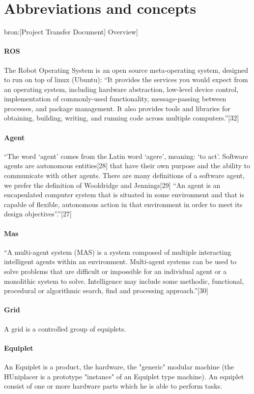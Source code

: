\documentclass[12pt,a4paper]{report}
\begin{document}
\chapter{Abbreviations and concepts}
bron:[Project Transfer Document] Overview]
\subsubsection{ROS}
The Robot Operating System is an open source meta-operating system, designed to run on top of linux (Ubuntu): “It provides the services you would expect from an operating system, including hardware abstraction, low-level device control, implementation of commonly-used functionality, message-passing between processes, and package management. It also provides tools and libraries for obtaining, building, writing, and running code across multiple computers.”[32]
\subsubsection{Agent}
“The word ‘agent’ comes from the Latin word ‘agere’, meaning: ‘to act’. Software agents are autonomous entities[28] that have their own purpose and the ability to communicate with other agents. There are many definitions of a software agent, we prefer the definition of Wooldridge and Jennings[29] “An agent is an encapsulated computer system that is situated in some environment and that is capable of flexible, autonomous action in that environment in
order to meet its design objectives”.”[27]
\subsubsection{Mas}
“A multi-agent system (MAS) is a system composed of multiple interacting intelligent agents within an environment. Multi-agent systems can be used to solve problems that are difficult or impossible for an individual agent or a monolithic system to solve. Intelligence may include some methodic, functional, procedural or algorithmic search, find and processing approach.”[30]
\subsubsection{Grid}
A grid is a controlled group of equiplets.
\subsubsection{Equiplet}
An Equiplet is a product, the hardware, the "generic" modular machine (the HUniplacer is a prototype "instance" of an Equiplet type machine). An equiplet consist of one or more hardware parts which he is able to perform tasks.
\end{document}
